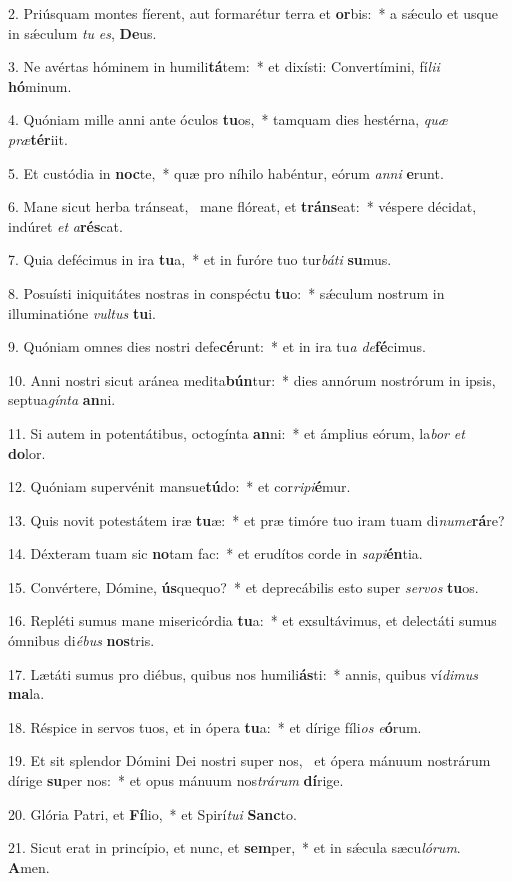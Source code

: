 2. Priúsquam montes fíerent, aut formarétur terra et \textbf{or}bis:~*  a sǽculo et usque in sǽculum \textit{tu} \textit{es}, \textbf{De}us.\

3. Ne avértas hóminem in humili\textbf{tá}tem:~*  et dixísti: Convertímini, fí\textit{li}\textit{i} \textbf{hó}minum.\

4. Quóniam mille anni ante óculos \textbf{tu}os,~*  tamquam dies hestérna, \textit{quæ} \textit{præ}\textbf{tér}iit.\

5. Et custódia in \textbf{noc}te,~*  quæ pro níhilo habéntur, eórum \textit{an}\textit{ni} \textbf{e}runt.\

6. Mane sicut herba tránseat, \dag\  mane flóreat, et \textbf{tráns}eat:~*  véspere décidat, indúret \textit{et} \textit{a}\textbf{rés}cat.\

7. Quia defécimus in ira \textbf{tu}a,~*  et in furóre tuo tur\textit{bá}\textit{ti} \textbf{su}mus.\

8. Posuísti iniquitátes nostras in conspéctu \textbf{tu}o:~*  sǽculum nostrum in illuminatióne \textit{vul}\textit{tus} \textbf{tu}i.\

9. Quóniam omnes dies nostri defe\textbf{cé}runt:~*  et in ira tu\textit{a} \textit{de}\textbf{fé}cimus.\

10. Anni nostri sicut aránea medita\textbf{bún}tur:~*  dies annórum nostrórum in ipsis, septua\textit{gín}\textit{ta} \textbf{an}ni.\

11. Si autem in potentátibus, octogínta \textbf{an}ni:~*  et ámplius eórum, la\textit{bor} \textit{et} \textbf{do}lor.\

12. Quóniam supervénit mansue\textbf{tú}do:~*  et cor\textit{ri}\textit{pi}\textbf{é}mur.\

13. Quis novit potestátem iræ \textbf{tu}æ:~*  et præ timóre tuo iram tuam di\textit{nu}\textit{me}\textbf{rá}re?\

14. Déxteram tuam sic \textbf{no}tam fac:~*  et erudítos corde in \textit{sa}\textit{pi}\textbf{én}tia.\

15. Convértere, Dómine, \textbf{ús}quequo?~*  et deprecábilis esto super \textit{ser}\textit{vos} \textbf{tu}os.\

16. Repléti sumus mane misericórdia \textbf{tu}a:~*  et exsultávimus, et delectáti sumus ómnibus di\textit{é}\textit{bus} \textbf{nos}tris.\

17. Lætáti sumus pro diébus, quibus nos humili\textbf{ás}ti:~*  annis, quibus ví\textit{di}\textit{mus} \textbf{ma}la.\

18. Réspice in servos tuos, et in ópera \textbf{tu}a:~*  et dírige fíli\textit{os} \textit{e}\textbf{ó}rum.\

19. Et sit splendor Dómini Dei nostri super nos, \dag\  et ópera mánuum nostrárum dírige \textbf{su}per nos:~*  et opus mánuum nos\textit{trá}\textit{rum} \textbf{dí}rige.\

20. Glória Patri, et \textbf{Fí}lio,~*  et Spirí\textit{tu}\textit{i} \textbf{Sanc}to.\

21. Sicut erat in princípio, et nunc, et \textbf{sem}per,~*  et in sǽcula sæcu\textit{ló}\textit{rum}. \textbf{A}men.\

